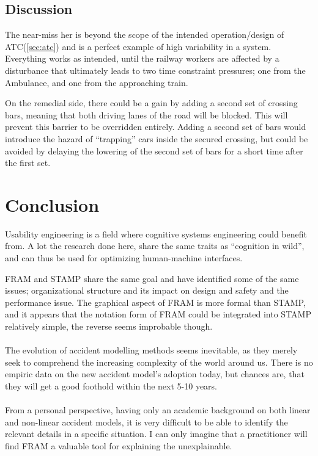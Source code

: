 \documentclass[10pt,oneside]{book}                  %
\begin{document}
\section{Discussion}

The near-miss her is beyond the scope of the intended operation/design of ATC(\ref{sec:atc}) and is a perfect example of high variability in a system. Everything works as intended, until the railway workers are affected by a disturbance that ultimately leads to two time constraint pressures; one from the Ambulance, and one from the approaching train.

On the remedial side, there could be a gain by adding a second set of crossing bars, meaning that both driving lanes of the road will be blocked. This will prevent this barrier to be overridden entirely. Adding a second set of bars would introduce the hazard of ``trapping'' cars inside the secured crossing, but could be avoided by delaying the lowering of the second set of bars for a short time after the first set.


\markboth{}{}
\chapter{Conclusion}
Usability engineering is a field where cognitive systems engineering could benefit from. A lot the research done here, share the same traits as ``cognition in wild'', and can thus be used for optimizing human-machine interfaces.

FRAM and STAMP share the same goal and have identified some of the same issues; organizational structure and its impact on design and safety and the performance issue. The graphical aspect of FRAM is more formal than STAMP, and it appears that the notation form of FRAM could be integrated into STAMP relatively simple, the reverse seems improbable though.\\
\\
The evolution of accident modelling methods seems inevitable, as they merely seek to comprehend the increasing complexity of the world around us. There is no empiric data on the new accident model's adoption today, but chances are, that they will get a good foothold within the next 5-10 years.\\
\\
From a personal perspective, having only an academic background on both linear and non-linear accident models, it is very difficult to be able to identify the relevant details in a specific situation. I can only imagine that a practitioner will find FRAM a valuable tool for explaining the unexplainable.
\end{document}
